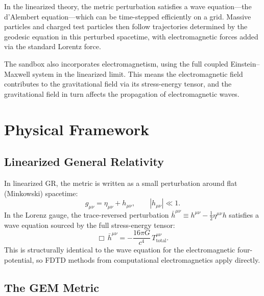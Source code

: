 \documentclass[11pt,a4paper]{article}
\begin{document}
In the linearized theory, the metric perturbation satisfies a wave equation---the d'Alembert equation---which can be time-stepped efficiently on a grid.  Massive particles and charged test particles then follow trajectories determined by the geodesic equation in this perturbed spacetime, with electromagnetic forces added via the standard Lorentz force.

The sandbox also incorporates electromagnetism, using the full coupled Einstein--Maxwell system in the linearized limit.  This means the electromagnetic field contributes to the gravitational field via its stress-energy tensor, and the gravitational field in turn affects the propagation of electromagnetic waves.

\section{Physical Framework}

\subsection{Linearized General Relativity}

In linearized GR, the metric is written as a small perturbation around flat (Minkowski) spacetime:
\begin{equation}
  g_{\mu\nu} = \eta_{\mu\nu} + h_{\mu\nu}, \qquad |h_{\mu\nu}| \ll 1.
\end{equation}
In the Lorenz gauge, the trace-reversed perturbation $\bar{h}^{\mu\nu} \equiv h^{\mu\nu} - \tfrac{1}{2}\eta^{\mu\nu}h$ satisfies a wave equation sourced by the full stress-energy tensor:
\begin{equation}
  \Box\,\bar{h}^{\mu\nu} = -\frac{16\pi G}{c^4}\,T^{\mu\nu}_{\mathrm{total}}.
\end{equation}
This is structurally identical to the wave equation for the electromagnetic four-potential, so FDTD methods from computational electromagnetics apply directly.

\subsection{The GEM Metric}
\label{sec:gem_metric}
\end{document}

